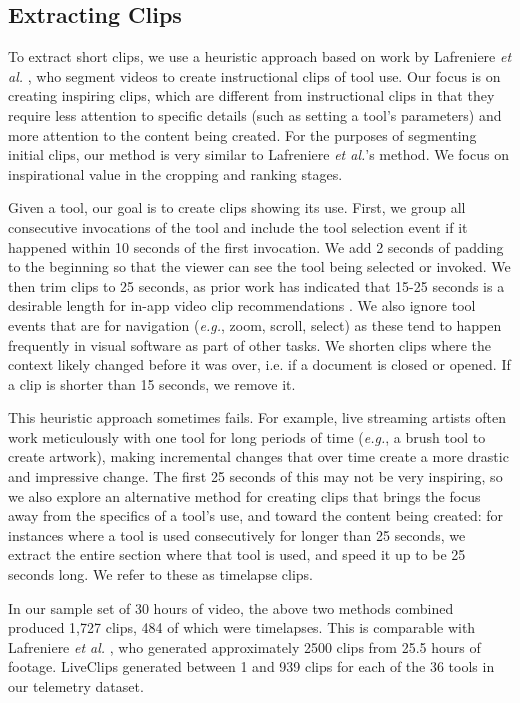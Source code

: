 \subsection{Extracting Clips}
To extract short clips, we use a heuristic approach based on work by Lafreniere \textit{et al.} \cite{Lafreniere2014}, who segment videos to create instructional clips of tool use. Our focus is on creating inspiring clips, which are different from instructional clips in that they require less attention to specific details (such as setting a tool's parameters) and more attention to the content being created. For the purposes of segmenting initial clips, our method is very similar to Lafreniere \textit{et al.}'s method. We focus on inspirational value in the cropping and ranking stages.

Given a tool, our goal is to create clips showing its use. First, we group all consecutive invocations of the tool and include the tool selection event if it happened within 10 seconds of the first invocation. We add 2 seconds of padding to the beginning so that the viewer can see the tool being selected or invoked. We then trim clips to 25 seconds, as prior work has indicated that 15-25 seconds is a desirable length for in-app video clip recommendations \cite{Lafreniere2014}. We also ignore tool events that are for navigation (\textit{e.g.}, zoom, scroll, select) as these tend to happen frequently in visual software as part of other tasks. We shorten clips where the context likely changed before it was over, i.e. if a document is closed or opened. If a clip is shorter than 15 seconds, we remove it.

This heuristic approach sometimes fails. For example, live streaming artists often work meticulously with one tool for long periods of time (\textit{e.g.}, a brush tool to create artwork), making incremental changes that over time create a more drastic and impressive change. The first 25 seconds of this may not be very inspiring, so we also explore an alternative method for creating clips that brings the focus away from the specifics of a tool's use, and toward the content being created: for instances where a tool is used consecutively for longer than 25 seconds, we extract the entire section where that tool is used, and speed it up to be 25 seconds long. We refer to these as timelapse clips.

In our sample set of 30 hours of video, the above two methods combined produced 1,727 clips, 484 of which were timelapses. This is comparable with Lafreniere \textit{et al.} \cite{Lafreniere2014}, who generated approximately 2500 clips from 25.5 hours of footage. LiveClips generated between 1 and 939 clips for each of the 36 tools in our telemetry dataset.


